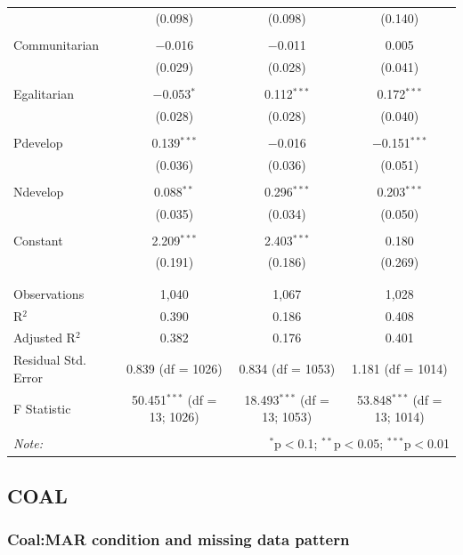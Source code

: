 \documentclass[
]{article}
\begin{document}
\begin{table}[!htbp]
\begin{tabular}{@{\extracolsep{5pt}}lccc}
  & (0.098) & (0.098) & (0.140) \\ 
  & & & \\ 
 Communitarian & $-$0.016 & $-$0.011 & 0.005 \\ 
  & (0.029) & (0.028) & (0.041) \\ 
  & & & \\ 
 Egalitarian & $-$0.053$^{*}$ & 0.112$^{***}$ & 0.172$^{***}$ \\ 
  & (0.028) & (0.028) & (0.040) \\ 
  & & & \\ 
 Pdevelop & 0.139$^{***}$ & $-$0.016 & $-$0.151$^{***}$ \\ 
  & (0.036) & (0.036) & (0.051) \\ 
  & & & \\ 
 Ndevelop & 0.088$^{**}$ & 0.296$^{***}$ & 0.203$^{***}$ \\ 
  & (0.035) & (0.034) & (0.050) \\ 
  & & & \\ 
 Constant & 2.209$^{***}$ & 2.403$^{***}$ & 0.180 \\ 
  & (0.191) & (0.186) & (0.269) \\ 
  & & & \\ 
\hline \\[-1.8ex] 
Observations & 1,040 & 1,067 & 1,028 \\ 
R$^{2}$ & 0.390 & 0.186 & 0.408 \\ 
Adjusted R$^{2}$ & 0.382 & 0.176 & 0.401 \\ 
Residual Std. Error & 0.839 (df = 1026) & 0.834 (df = 1053) & 1.181 (df = 1014) \\ 
F Statistic & 50.451$^{***}$ (df = 13; 1026) & 18.493$^{***}$ (df = 13; 1053) & 53.848$^{***}$ (df = 13; 1014) \\ 
\hline 
\hline \\[-1.8ex] 
\textit{Note:}  & \multicolumn{3}{r}{$^{*}$p$<$0.1; $^{**}$p$<$0.05; $^{***}$p$<$0.01} \\ 
\end{tabular} 
\end{table} 
\endgroup

\hypertarget{coal}{%
\subsection{COAL}\label{coal}}

\hypertarget{coalmar-condition-and-missing-data-pattern}{%
\subsubsection{Coal:MAR condition and missing data
pattern}\label{coalmar-condition-and-missing-data-pattern}}
\end{document}
